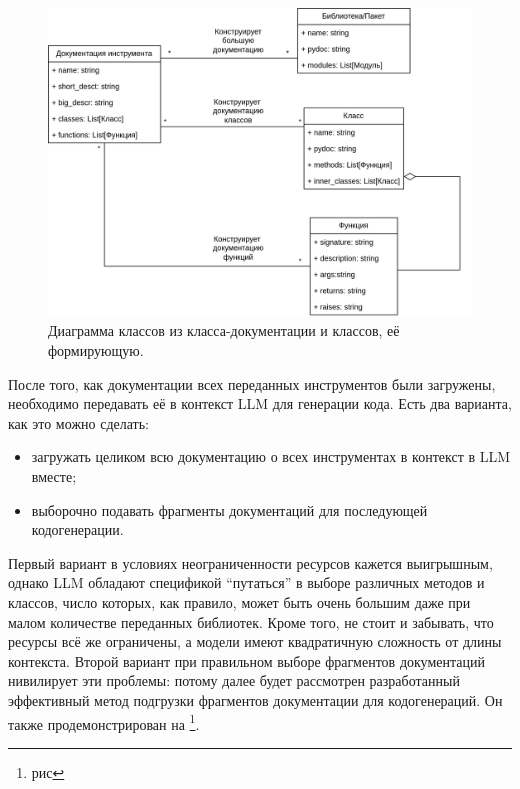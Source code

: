\begin{figure}
    \center
	\includegraphics[scale=0.16]{sources/генерация документации.drawio.png}
	\caption{Диаграмма классов из класса-документации и классов, её формирующую.} 
	\label{fig:ch3:pydocs}  
\end{figure}

После того, как документации всех переданных инструментов 
были загружены, необходимо передавать её в контекст LLM
для генерации кода. Есть два варианта, как это можно сделать:
\begin{itemize}
    \item загружать целиком всю документацию о всех инструментах в контекст в LLM вместе;
    \item выборочно подавать фрагменты документаций для последующей кодогенерации.
\end{itemize}

Первый вариант в условиях неограниченности ресурсов кажется выигрышным, однако LLM обладают
спецификой ``путаться'' в выборе различных методов и классов, число которых, 
как правило, может быть очень большим даже при малом количестве переданных библиотек. 
Кроме того, не стоит и забывать, что ресурсы всё же ограничены, 
а модели имеют квадратичную сложность от длины контекста. 
Второй вариант при правильном выборе фрагментов документаций нивилирует эти проблемы: потому
далее будет рассмотрен разработанный эффективный метод подгрузки фрагментов 
документации для кодогенераций. Он также продемонстрирован на \footnote{рис}.

